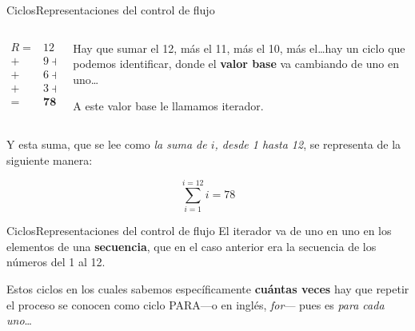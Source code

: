 \documentclass[spanish, c]{beamer}
\begin{document}
\begin{frame}{Ciclos}{Representaciones del control de flujo}

    \begin{columns}
        \begin{column}{0.5\linewidth}
            \begin{align*}
                R = & 12  + 11 + 10 \\
                  + &  9 + 8 + 7 \\
                  + &  6 + 5 + 4 \\
                  + &  3 + 2 + 1 \\
                  = & \mathbf{78}
            \end{align*} \pause
        \end{column}

        \begin{column}{0.5\linewidth}
            Hay que sumar el 12, más el 11, más el 10, más el\dots hay un ciclo que podemos identificar, donde el \textbf{valor base} va cambiando de uno en uno\dots

            A este valor base le llamamos \alert{iterador}. \pause
        \end{column}
    \end{columns}

    Y esta suma, que se lee como \textit{la suma de $i$, desde 1 hasta 12}, se representa de la siguiente manera:
    
    $$\sum\limits_{i=1}^{i=12} i = 78$$
\end{frame}

\begin{frame}{Ciclos}{Representaciones del control de flujo}
    El \alert{iterador} va de uno en uno en los elementos de una \textbf{secuencia}, que en el caso anterior era la secuencia de los números del 1 al 12.

    \bigskip

    Estos ciclos en los cuales sabemos específicamente \textbf{cuántas veces} hay que repetir el proceso se conocen como \alert{ciclo PARA}---o en inglés, \textit{for}--- pues es \textit{para cada uno}\dots

    \bigskip

    \begin{columns}
        \begin{column}{0.95\linewidth}
            
        \end{column}
    \end{columns}
\end{frame}
\end{document}
